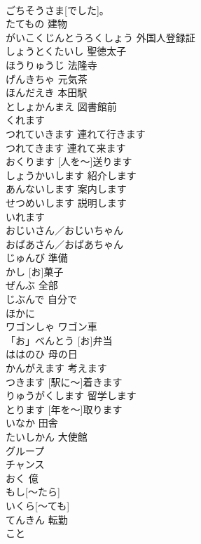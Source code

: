 \documentclass[8pt]{extreport}
\begin{document}
\begin{CJK}{UTF8}{min}
\\	ごちそうさま[でした]。			
\\	たてもの	建物	
\\	がいこくじんとうろくしょう	外国人登録証	
\\	しょうとくたいし	聖徳太子	
\\	ほうりゅうじ	法隆寺	
\\	げんきちゃ	元気茶	
\\	ほんだえき	本田駅	
\\	としょかんまえ	図書館前	
\\	くれます			
\\	つれていきます	連れて行きます	
\\	つれてきます	連れて来ます	
\\	[ひとを～]おくります	[人を～]送ります	
\\	しょうかいします	紹介します	
\\	あんないします	案内します	
\\	せつめいします	説明します	
\\	[コーヒーを～]いれます			
\\	おじいさん／おじいちゃん			
\\	おばあさん／おばあちゃん			
\\	じゅんび	準備	
\\	[～します:
\\	いみ	意味	
\\	[お]かし	[お]菓子	
\\	ぜんぶ	全部	
\\	じぶんで	自分で	
\\	ほかに			
\\	ワゴンしゃ	ワゴン車	
\\	「お」べんとう	[お]弁当	
\\	ははのひ	母の日	
\\	かんがえます	考えます	
\\	[えきに～] つきます	[駅に～]着きます	
\\	りゅうがくします	留学します	
\\	[としを～]とります	[年を～]取ります	
\\	いなか	田舎	
\\	たいしかん	大使館	
\\	グループ			
\\	チャンス			
\\	おく	億	
\\	もし[～たら]			
\\	いくら[～ても]			
\\	てんきん	転勤	
\\	こと			

\end{CJK}
\end{document}
